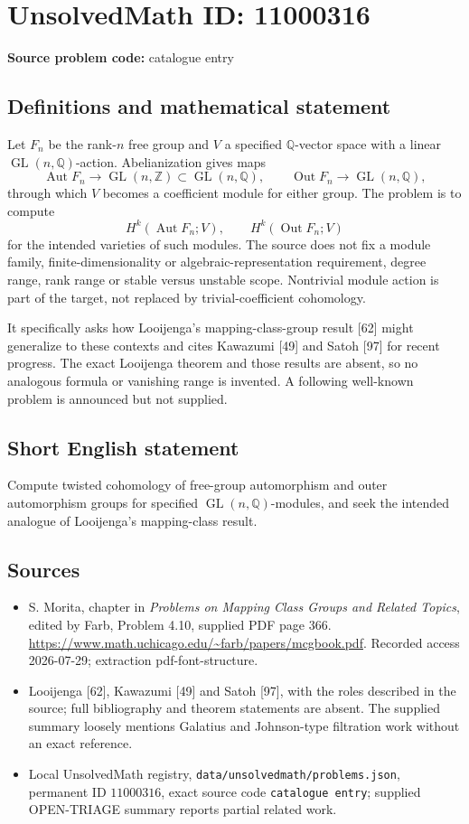 \documentclass[11pt]{article}
\newcommand{\Z}{\mathbb{Z}}
\newcommand{\Q}{\mathbb{Q}}
\begin{document}
\section*{UnsolvedMath ID: 11000316}
\textbf{Source problem code:} catalogue entry
\subsection{Definitions and mathematical statement}
Let \(F_n\) be the rank-\(n\) free group and \(V\) a specified \(\Q\)-vector space with a linear \(\operatorname{GL}(n,\Q)\)-action. Abelianization gives maps
\[
 \operatorname{Aut}F_n\longrightarrow\operatorname{GL}(n,\Z)
 \subset\operatorname{GL}(n,\Q),\qquad
 \operatorname{Out}F_n\longrightarrow\operatorname{GL}(n,\Q),
\]
through which \(V\) becomes a coefficient module for either group. The problem is to compute
\[
 H^k(\operatorname{Aut}F_n;V),\qquad
 H^k(\operatorname{Out}F_n;V)
\]
for the intended varieties of such modules. The source does not fix a module family, finite-dimensionality or algebraic-representation requirement, degree range, rank range or stable versus unstable scope. Nontrivial module action is part of the target, not replaced by trivial-coefficient cohomology.

It specifically asks how Looijenga's mapping-class-group result [62] might generalize to these contexts and cites Kawazumi [49] and Satoh [97] for recent progress. The exact Looijenga theorem and those results are absent, so no analogous formula or vanishing range is invented. A following well-known problem is announced but not supplied.
\subsection{Short English statement}
Compute twisted cohomology of free-group automorphism and outer automorphism groups for specified \(\operatorname{GL}(n,\Q)\)-modules, and seek the intended analogue of Looijenga's mapping-class result.
\subsection{Sources}
\begin{itemize}
\item S. Morita, chapter in \emph{Problems on Mapping Class Groups and Related Topics}, edited by Farb, Problem 4.10, supplied PDF page 366. \url{https://www.math.uchicago.edu/~farb/papers/mcgbook.pdf}. Recorded access 2026-07-29; extraction pdf-font-structure.
\item Looijenga [62], Kawazumi [49] and Satoh [97], with the roles described in the source; full bibliography and theorem statements are absent. The supplied summary loosely mentions Galatius and Johnson-type filtration work without an exact reference.
\item Local UnsolvedMath registry, \texttt{data/unsolvedmath/problems.json}, permanent ID \(11000316\), exact source code \texttt{catalogue entry}; supplied OPEN-TRIAGE summary reports partial related work.
\end{itemize}
\end{document}
